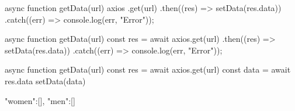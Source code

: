 async function getData(url) {
    axios
      .get(url)
      .then((res) => setData(res.data))
      .catch((err) => console.log(err, "Error"));
}

async function getData(url) {
  const res = await axios.get(url)
    .then((res) => setData(res.data))
    .catch((err) => console.log(err, "Error"));
}

async function getData(url) {
    const res = await axios.get(url)
    const data = await res.data
    setData(data)
}





{
  "women":[],
  "men":[]
}